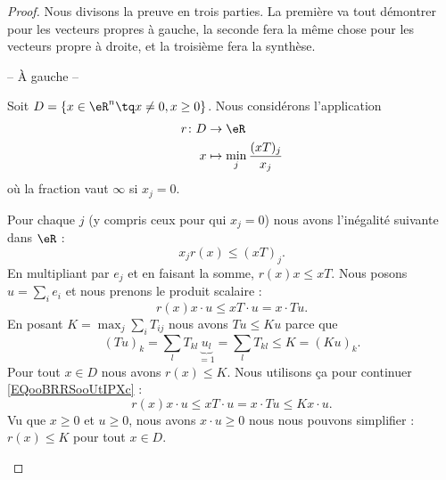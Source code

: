 \begin{proof}
	Nous divisons la preuve en trois parties. La première va tout démontrer pour les vecteurs propres à gauche, la seconde fera la même chose pour les vecteurs propre à droite, et la troisième fera la synthèse.
	\begin{center}
		-- À gauche --
	\end{center}
	Soit \( D=\{ x\in \eR^n\tq x\neq 0, x\geq 0 \}\). Nous considérons l'application
	\begin{equation}
		\begin{aligned}
			r\colon D & \to \eR                              \\
			x         & \mapsto \min_j\frac{ (xT)_j }{ x_j }
		\end{aligned}
	\end{equation}
	où la fraction vaut \( \infty\) si \( x_j=0\).

	\begin{subproof}
		Pour chaque \( j\) (y compris ceux pour qui \( x_j=0\)) nous avons l'inégalité suivante dans \( \eR\) :
		\begin{equation}
			x_j r(x)\leq (xT)_j.
		\end{equation}
		En multipliant par \( e_j\) et en faisant la somme, \( r(x)x\leq xT\). Nous posons \( u=\sum_ie_i\) et nous prenons le produit scalaire :
		\begin{equation}        \label{EQooBRRSooUtIPXc}
			r(x)x\cdot u\leq xT\cdot u=x\cdot Tu.
		\end{equation}
		En posant \( K=\max_j\sum_{i}T_{ij}\) nous avons \( Tu\leq Ku\) parce que
		\begin{equation}
			(Tu)_k=\sum_{l}T_{kl}\underbrace{u_l}_{=1}=\sum_lT_{kl}\leq K= (Ku)_k.
		\end{equation}
		Pour tout \( x\in D\) nous avons \( r(x)\leq K\). Nous utilisons ça pour continuer \eqref{EQooBRRSooUtIPXc} :
		\begin{equation}
			r(x)x\cdot u\leq xT\cdot u=x\cdot Tu\leq Kx\cdot u.
		\end{equation}
		Vu que \( x\geq 0\) et \( u\geq 0\), nous avons \( x\cdot u\geq 0\) nous nous pouvons simplifier : \( r(x)\leq K\) pour tout \( x\in D\).


\end{subproof}
\end{proof}
